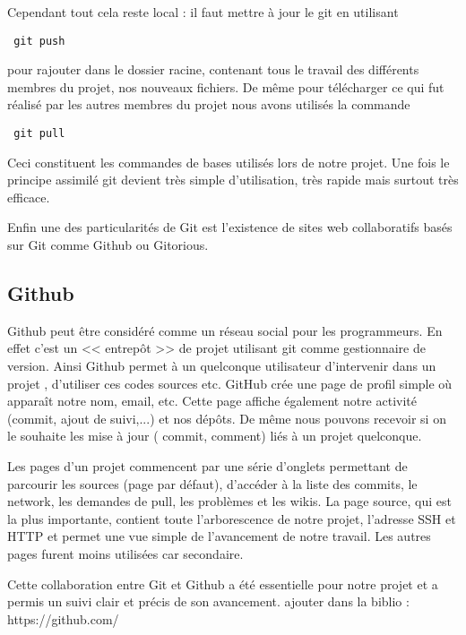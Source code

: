 Cependant tout cela reste local : il faut mettre \`a jour le git en utilisant
\begin{verbatim} git push \end{verbatim}
pour rajouter dans le dossier racine, contenant tous le travail des diff\'erents membres du projet, nos nouveaux fichiers. 
De m\^eme pour t\'el\'echarger ce qui fut r\'ealis\'e par les autres membres du projet nous avons utilis\'es la commande
\begin{verbatim} git pull \end{verbatim}

Ceci constituent les commandes de bases utilis\'es lors de notre projet. Une fois le principe assimil\'e git devient tr\`es simple d'utilisation,
 tr\`es rapide mais surtout tr\`es efficace.

Enfin une des particularit\'es de Git est l'existence de sites web collaboratifs bas\'es sur Git comme Github ou Gitorious. 

\subsection{Github}

Github peut \^etre consid\'er\'e comme un r\'eseau social pour les programmeurs. En effet c'est un << entrep\^ot >> de projet utilisant git comme 
gestionnaire de version. Ainsi Github permet \`a un quelconque utilisateur d'intervenir dans un projet , d'utiliser ces codes sources etc.
GitHub cr\'ee une page de profil simple o\`u appara\^it notre nom, email, etc. Cette page affiche \'egalement notre activit\'e (commit, ajout de suivi,...)
 et nos d\'ep\^ots. De m\^eme nous pouvons recevoir si on le souhaite les mise \`a  jour ( commit, comment) li\'es \`a un projet quelconque.

Les pages d'un projet commencent par une s\'erie d'onglets permettant de parcourir les sources (page par d\'efaut), d'acc\'eder \`a la liste des
 commits, le network, les demandes de pull, les probl\`emes et les wikis.
La page source, qui est la plus importante, contient toute l'arborescence de notre projet, l'adresse SSH et HTTP et permet une vue simple
 de l'avancement de notre travail.
Les autres pages furent moins utilis\'ees car secondaire. 

Cette collaboration entre Git et Github a \'et\'e essentielle pour notre projet et a permis un suivi clair et pr\'ecis de son avancement.
\newline
\newline
\newline
\newline
ajouter dans la biblio :
\newline
https://github.com/

